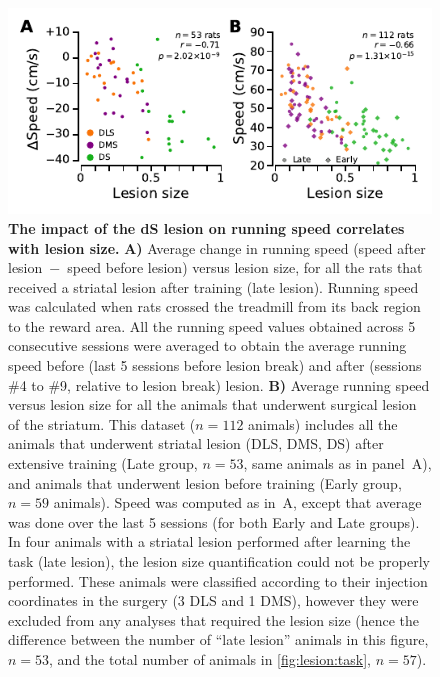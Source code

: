 \begin{figure}[h!]
    \begin{center}
        \includegraphics[scale=1]{ch-appendicies/figures/Speed.pdf}
        \caption
        {\textbf{The impact of the dS lesion on running speed correlates with lesion size.}
        \textbf{A)} Average change in running speed (speed after lesion~$-$~speed before lesion) versus lesion size, for all the rats that received a striatal lesion after training (late lesion).
        Running speed was calculated when rats crossed the treadmill from its back region to the reward area.
        All the running speed values obtained across 5 consecutive sessions were averaged to obtain the average running speed before (last 5 sessions before lesion break) and after (sessions \#4 to \#9, relative to lesion break) lesion.
        \textbf{B)} Average running speed versus lesion size for all the animals that underwent surgical lesion of the striatum.
        This dataset ($n=112$ animals) includes all the animals that underwent striatal lesion (DLS, DMS, DS) after extensive training (Late group, $n=53$, same animals as in panel~A), and animals that underwent lesion before training (Early group, $n=59$ animals).
        Speed was computed as in~A, except that average was done over the last 5 sessions (for both Early and Late groups).
        In four animals with a striatal lesion performed after learning the task (late lesion), the lesion size quantification could not be properly performed.
        These animals were classified according to their injection coordinates in the surgery (3 DLS and 1 DMS), however they were excluded from any analyses that required the lesion size (hence the difference between the number of ``late lesion'' animals in this figure, $n=53$, and the total number of animals in \autoref{fig:lesion:task}, $n=57$).
        }
        \label{fig:appendix:spd}
    \end{center}
\end{figure}